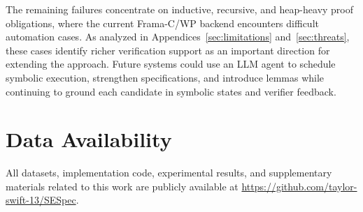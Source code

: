 \documentclass[lettersize,journal]{IEEEtran}
\def\revcolor{blue}
\DeclareRobustCommand{\rev}[1]{{\color{\revcolor}#1}}
\newcommand{\apptworef}[2]{Appendices~\ref{#1} and~\ref{#2}}
\begin{document}
\rev{The remaining failures concentrate on inductive, recursive, and heap-heavy proof obligations, where the current Frama-C/WP backend encounters difficult automation cases. As analyzed in \apptworef{sec:limitations}{sec:threats}, these cases identify richer verification support as an important direction for extending the approach. Future systems could use an LLM agent to schedule symbolic execution, strengthen specifications, and introduce lemmas while continuing to ground each candidate in symbolic states and verifier feedback.}


\section*{Data Availability}
All datasets, implementation code, experimental results, and supplementary materials related to this work are publicly available at \url{https://github.com/taylor-swift-13/SESpec}.





\clearpage
\appendices
\raggedbottom












\end{document}
